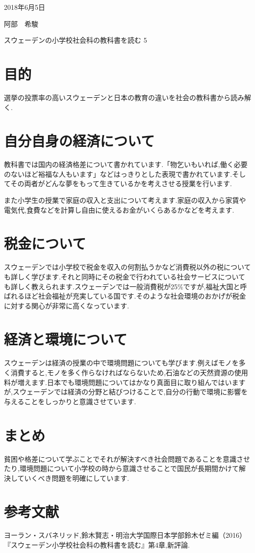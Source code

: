 \documentclass[a4j,10pt]{jsarticle}
\begin{document}
\begin{flushright} %
2018年6月5日

阿部　希駿
\end{flushright}

\begin{center}
\Large{スウェーデンの小学校社会科の教科書を読む 5}
\end{center}

\section{目的}
\label{sec:kihon}
選挙の投票率の高いスウェーデンと日本の教育の違いを社会の教科書から読み解く.

\section{自分自身の経済について}
教科書では国内の経済格差について書かれています.「物乞いもいれば,働く必要のないほど裕福な人もいます」などはっきりとした表現で書かれています.そしてその両者がどんな夢をもって生きているかを考えさせる授業を行います.

また小学生の授業で家庭の収入と支出について考えます.家庭の収入から家賃や電気代,食費などを計算し自由に使えるお金がいくらあるかなどを考えます.

\section{税金について}
スウェーデンでは小学校で税金を収入の何割払うかなど消費税以外の税についても詳しく学びます.それと同時にその税金で行われている社会サービスについても詳しく教えられます.スウェーデンでは一般消費税が25\%ですが,福祉大国と呼ばれるほど社会福祉が充実している国です.そのような社会環境のおかげが税金に対する関心が非常に高くなっています.

\section{経済と環境について}
スウェーデンは経済の授業の中で環境問題についても学びます.例えばモノを多く消費すると,モノを多く作らなければならないため,石油などの天然資源の使用料が増えます.日本でも環境問題についてはかなり真面目に取り組んではいますが,スウェーデンでは経済の分野と結びつけることで,自分の行動で環境に影響を与えることをしっかりと意識させています.

\section{まとめ}
\label{sec:kihon}
貧困や格差について学ぶことでそれが解決すべき社会問題であることを意識させたり,環境問題について小学校の時から意識させることで国民が長期間かけて解決していくべき問題を明確にしています.


\section{参考文献}
\label{sec:kihon}
ヨーラン・スバネリッド,鈴木賢志・明治大学国際日本学部鈴木ゼミ編（2016）『スウェーデン小学校社会科の教科書を読む』第4章,新評論.
  
\end{document}
